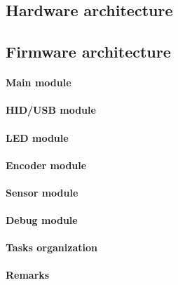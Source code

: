 \documentclass[a4paper,10pt]{article}
\begin{document}
\begin{multicols}{2}
\subsection{Hardware architecture}

\TODO


\subsection{Firmware architecture}

\TODO


\paragraph{Main module}
\TODO


\paragraph{HID/USB module}
\TODO


\paragraph{LED module}
\TODO


\paragraph{Encoder module}
\TODO


\paragraph{Sensor module}
\TODO


\paragraph{Debug module}
\TODO


\paragraph{Tasks organization}
\TODO


\paragraph{Remarks}
\TODO



\end{multicols}
\end{document}
